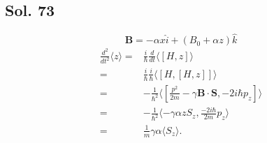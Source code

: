  \subsection*{Sol. 73}
 $$
 \bm B = -\alpha x\hat i + (B_0+\alpha z)\hat k 
 $$
 \begin{align*}
     \frac{d^2}{dt^2}
     \langle z\rangle
     =&
     \frac{i}{\hbar}
     \frac{d}{dt}
     \langle[H,z]\rangle\\
     =&\frac{i}{\hbar}
     \frac{i}{\hbar}
     \langle[H,[H,z]]\rangle\\
     =&-\frac{1}{\hbar^2}
     \langle[\frac{p^2}{2m}-\gamma\bm B\cdot \bm S, -2i\hbar p_z]\rangle\\
     =&-\frac{1}{\hbar^2}
     \langle-\gamma \alpha z S_z, \frac{-2i\hbar}{2m} p_z\rangle\\
     =&\frac{1}{m}\gamma\alpha\langle S_z\rangle.
 \end{align*}

